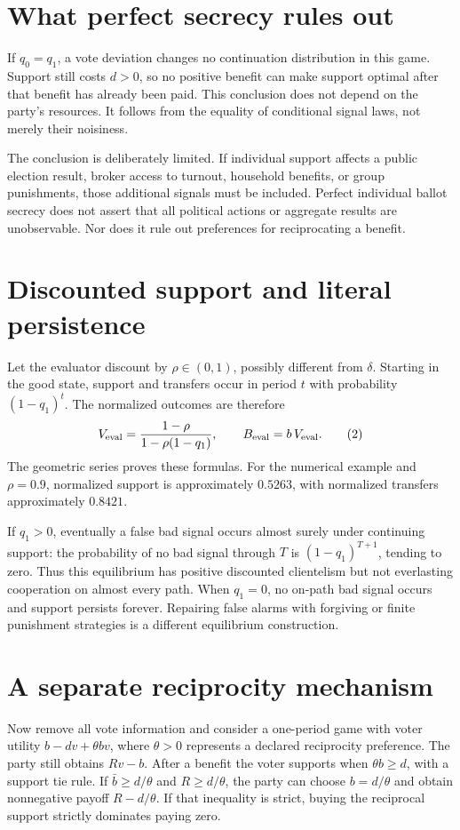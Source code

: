 \documentclass[11pt,a4paper]{article}
\begin{document}
\section{What perfect secrecy rules out}
If $q_0=q_1$, a vote deviation changes no continuation distribution in this game. Support still costs $d>0$, so no positive benefit can make support optimal after that benefit has already been paid. This conclusion does not depend on the party's resources. It follows from the equality of conditional signal laws, not merely their noisiness.

The conclusion is deliberately limited. If individual support affects a public election result, broker access to turnout, household benefits, or group punishments, those additional signals must be included. Perfect individual ballot secrecy does not assert that all political actions or aggregate results are unobservable. Nor does it rule out preferences for reciprocating a benefit.
\section{Discounted support and literal persistence}
Let the evaluator discount by $\rho\in(0,1)$, possibly different from $\delta$. Starting in the good state, support and transfers occur in period $t$ with probability $(1-q_1)^t$. The normalized outcomes are therefore
\[
 V_{\rm eval}=\frac{1-\rho}{1-\rho(1-q_1)},\qquad
 B_{\rm eval}=b\,V_{\rm eval}.
 \tag{2}
\]
The geometric series proves these formulas. For the numerical example and $\rho=0.9$, normalized support is approximately $0.5263$, with normalized transfers approximately $0.8421$.

If $q_1>0$, eventually a false bad signal occurs almost surely under continuing support: the probability of no bad signal through $T$ is $(1-q_1)^{T+1}$, tending to zero. Thus this equilibrium has positive discounted clientelism but not everlasting cooperation on almost every path. When $q_1=0$, no on-path bad signal occurs and support persists forever. Repairing false alarms with forgiving or finite punishment strategies is a different equilibrium construction.
\section{A separate reciprocity mechanism}
Now remove all vote information and consider a one-period game with voter utility
$b-dv+\theta bv$, where $\theta>0$ represents a declared reciprocity preference. The party still obtains $Rv-b$. After a benefit the voter supports when $\theta b\ge d$, with a support tie rule. If $\bar b\ge d/\theta$ and $R\ge d/\theta$, the party can choose $b=d/\theta$ and obtain nonnegative payoff $R-d/\theta$. If that inequality is strict, buying the reciprocal support strictly dominates paying zero.
\end{document}
